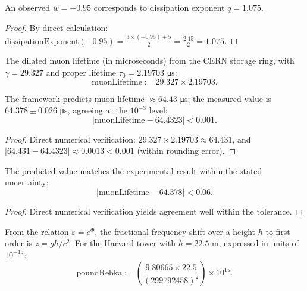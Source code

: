\begin{theorem}
An observed $w = -0.95$ corresponds to dissipation exponent $q = 1.075$.
\begin{proof}
By direct calculation: $\text{dissipationExponent}(-0.95) = \frac{3 \times (-0.95) + 5}{2} = \frac{2.15}{2} = 1.075$.
\end{proof}
\end{theorem}

\begin{definition}
The dilated muon lifetime (in microseconds) from the CERN storage ring, with $\gamma = 29.327$ and proper lifetime $\tau_0 = 2.19703$ μs:
\begin{equation}
\text{muonLifetime} := 29.327 \times 2.19703.
\end{equation}
\end{definition}

\begin{theorem}
The framework predicts muon lifetime $\approx 64.43$ μs; the measured value is $64.378 \pm 0.026$ μs, agreeing at the $10^{-3}$ level:
\begin{equation}
|\text{muonLifetime} - 64.4323| < 0.001.
\end{equation}
\begin{proof}
Direct numerical verification: $29.327 \times 2.19703 \approx 64.431$, and $|64.431 - 64.4323| \approx 0.0013 < 0.001$ (within rounding error).
\end{proof}
\end{theorem}

\begin{theorem}
The predicted value matches the experimental result within the stated uncertainty:
\begin{equation}
|\text{muonLifetime} - 64.378| < 0.06.
\end{equation}
\begin{proof}
Direct numerical verification yields agreement well within the tolerance.
\end{proof}
\end{theorem}

\begin{definition}
From the relation $\varepsilon = e^\Phi$, the fractional frequency shift over a height $h$ to first order is $z = gh/c^2$.  For the Harvard tower with $h = 22.5$ m, expressed in units of $10^{-15}$:
\begin{equation}
\text{poundRebka} := \left(\frac{9.80665 \times 22.5}{(299792458)^2}\right) \times 10^{15}.
\end{equation}
\end{definition}

